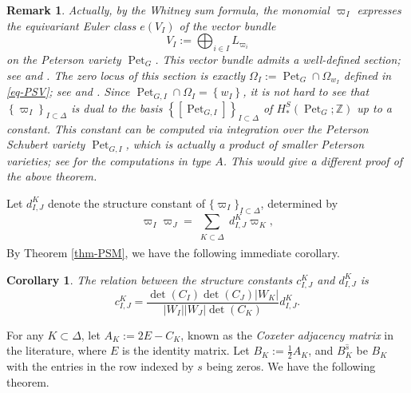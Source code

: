 \documentclass[11pt, letterpaper]{amsart}
\numberwithin{equation}{section}
\newtheorem{corollary}[theorem]{Corollary}
\newtheorem{remark}[theorem]{Remark}
\DeclareMathOperator{\Pet}{Pet}
\begin{document}
\begin{remark}
    Actually, by the Whitney sum formula, the monomial $\varpi_I$ expresses the equivariant Euler class $e\left(V_I\right)$ of the vector bundle 
    $$
V_I:=\bigoplus_{i \in I} L_{\varpi_i}
$$
on the Peterson variety $\Pet_{G}$. This vector bundle admits a well-defined section; see \cite[Section 3.2]{abe2024geometry} and \cite[Section 5.2]{abe2023peterson}. The zero locus of this section is exactly $\Omega_{I}:=\Pet_{G}\cap\Omega_{w_{I}}$ defined in \eqref{eq-PSV}; see \cite[Proposition 3.12]{abe2024geometry} and \cite[Section 5.4]{abe2023peterson}. Since $\Pet_{G,I} \cap \Omega_I=\left\{w_I\right\}$, it is not hard to see that $\left\{\varpi_I\right\}_{I \subset \Delta}$ is dual to the basis $\left\{\left[\Pet_{G,I}\right]\right\}_{I \subset \Delta}$ of $H^S_*(\Pet_{G};\mathbb{Z})$ up to a constant. This constant can be computed via integration over the Peterson Schubert variety $\Pet_{G,I}$, which is actually a product of smaller Peterson varieties; see \cite[Section 4.2] {abe2024geometry} for the computations in type $A$. This would give a different proof of the above theorem.
\end{remark}

Let $d_{I,J}^K$ denote the structure constant of $\{\varpi_{I}\}_{I\subset\Delta}$,
determined by 
$$\varpi_I \varpi_J=\sum_{\substack{K\subset \Delta\\}} d^{K}_{I,J}\varpi_K,$$
By Theorem \ref{thm-PSM}, we have the following immediate corollary.

\begin{corollary}\label{cor-relation}
    The relation between the structure constants $c_{I,J}^K$ and $d_{I,J}^K$ is
\[
c_{I,J}^K = \frac{\det(C_I) \det(C_J) |W_K|}{|W_I| |W_J| \det(C_K)} d_{I,J}^K.
\]

\end{corollary}

For any $K\subset\Delta$, let $A_K:=2E-C_K$, known as the \emph{Coxeter adjacency matrix} in the literature, where $E$ is the identity matrix. Let $B_K:=\frac{1}{2}A_K$, and $B_K^{\widehat{s}}$ be $B_K$ with the entries in the row indexed by $s$ being zeros. We have the following theorem.
\end{document}
